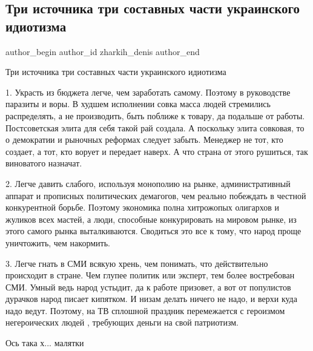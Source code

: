  
 
 
 
 
 
\subsection{Три источника три составных части украинского идиотизма}
\label{sec:30_12_2014.fb.zharkih_denis.1.ukr_idiotizm}
 
\ifcmt
 author_begin
   author_id zharkih_denis
 author_end
\fi

Три источника три составных части украинского идиотизма

1. Украсть из бюджета легче, чем заработать самому. Поэтому в руководстве
паразиты и воры. В худшем исполнении совка масса людей стремились распределять,
а не производить, быть поближе к товару, да подальше от работы. Постсоветская
элита для себя такой рай создала. А поскольку элита совковая, то о демократии и
рыночных реформах следует забыть. Менеджер не тот, кто создает, а тот, кто
ворует и передает наверх. А что страна от этого рушиться, так виноватого
назначат. 

2. Легче давить слабого, используя монополию на рынке, административный аппарат
и прописных политических демагогов, чем реально побеждать в честной
конкурентной борьбе. Поэтому экономика полна хитрожопых олигархов и жуликов
всех мастей, а люди, способные конкурировать на мировом рынке, из этого самого
рынка выталкиваются. Сводиться это все к тому, что народ проще уничтожить, чем
накормить. 

3. Легче гнать в СМИ всякую хрень, чем понимать, что действительно происходит в
стране. Чем глупее политик или эксперт, тем более востребован СМИ. Умный ведь
народ устыдит, да к работе призовет, а вот от популистов дурачков народ писает
кипятком. И низам делать ничего не надо, и верхи куда надо ведут. Поэтому, на
ТВ сплошной праздник перемежается с героизмом негероических людей , требующих
деньги на свой патриотизм. 

Ось така х... малятки

